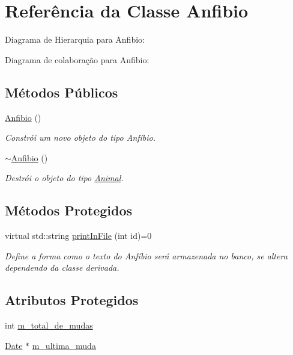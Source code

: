 \hypertarget{classAnfibio}{}\section{Referência da Classe Anfibio}
\label{classAnfibio}


Diagrama de Hierarquia para Anfibio\+:


Diagrama de colaboração para Anfibio\+:
\subsection*{Métodos Públicos}
\begin{DoxyCompactItemize}
\item 
\mbox{\label{classAnfibio_a91fd9b91b9124ab41ea9e9c9bb013476}} 
\hyperlink{classAnfibio_a91fd9b91b9124ab41ea9e9c9bb013476}{Anfibio} ()
\begin{DoxyCompactList}\small\item\em Constrói um novo objeto do tipo Anfíbio. \end{DoxyCompactList}\item 
\mbox{\label{classAnfibio_a53bb71a1ed0e79c5fc41a62a0af9060c}} 
\hyperlink{classAnfibio_a53bb71a1ed0e79c5fc41a62a0af9060c}{$\sim$\+Anfibio} ()
\begin{DoxyCompactList}\small\item\em Destrói o objeto do tipo \hyperlink{classAnimal}{Animal}. \end{DoxyCompactList}\end{DoxyCompactItemize}
\subsection*{Métodos Protegidos}
\begin{DoxyCompactItemize}
\item 
virtual std\+::string \hyperlink{classAnfibio_ab866ca21fb00c2d4d571aadd271eadec}{print\+In\+File} (int id)=0
\begin{DoxyCompactList}\small\item\em Define a forma como o texto do Anfíbio será armazenada no banco, se altera dependendo da classe derivada. \end{DoxyCompactList}\end{DoxyCompactItemize}
\subsection*{Atributos Protegidos}
\begin{DoxyCompactItemize}
\item 
int \hyperlink{classAnfibio_a994200134b0d314e3db0ac5c781bb7e7}{m\+\_\+total\+\_\+de\+\_\+mudas}
\item 
\hyperlink{classDate}{Date} $\ast$ \hyperlink{classAnfibio_abc4969388066028d800dd134d3fc3ae9}{m\+\_\+ultima\+\_\+muda}
\end{DoxyCompactItemize}
